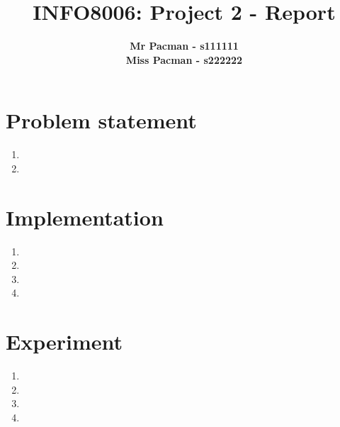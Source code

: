 \documentclass{article}
\begin{document}

\title{\Large{INFO8006: Project 2 - Report}}
\vspace{1cm}
\author{\small{\bf Mr Pacman - s111111} \\ \small{\bf Miss Pacman - s222222}}

\maketitle


\section{Problem statement}

\begin{enumerate}[label=\alph*.]
    \item
	\item
\end{enumerate}

\section{Implementation}

\begin{enumerate}[label=\alph*.]
	\item
    \item
    \item
    \item
\end{enumerate}

\section{Experiment}

\begin{enumerate}[label=\alph*.]
    \item
    \item
    \item
    \item
\end{enumerate}



\end{document}
